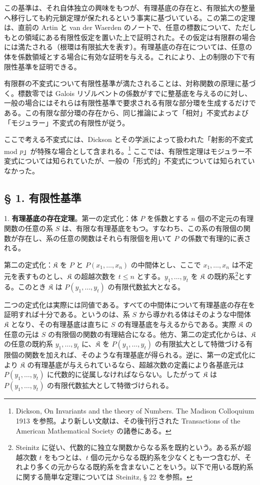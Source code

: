 \documentclass[11pt]{article}
\begin{document}
この基準は、それ自体独立の興味をもつが、有理基底の存在と、有限拡大の整量へ移行しても約元鎖定理が保たれるという事実に基づいている。この第二の定理は、直前の Artin と van der Waerden のノートで、任意の標数について、ただしもとの領域にある有限性仮定を置いた上で証明された。その仮定は有限群の場合には満たされる（根環は有限拡大を表す）。有理基底の存在については、任意の体を係数領域とする場合に有効な証明を与える。これにより、上の制限の下で有限性基準を証明できる。

有限群の不変式について有限性基準が満たされることは、対称関数の原理に基づく。標数零では Galois リゾルベントの係数がすでに整基底を与えるのに対し、一般の場合にはそれらは有限性基準で要求される有限な部分環を生成するだけである。この有限な部分環の存在から、同じ推論によって「相対」不変式および「モジュラー」不変式の有限性が従う。

ここで考える不変式には、Dickson とその学派によって扱われた「射影的不変式 mod $p$」が特殊な場合として含まれる。\footnote{Dickson, On Invariants and the theory of Numbers. The Madison Colloquium 1913 を参照。より新しい文献は、その後刊行された Transactions of the American Mathematical Society の諸巻にある。} ここでは、有限性定理はモジュラー不変式については知られていたが、一般の「形式的」不変式については知られていなかった。

\subsection*{§ 1. 有限性基準}

1. \textbf{有理基底の存在定理}。第一の定式化：体 $P$ を係数とする $n$ 個の不定元の有理関数の任意の系 $S$ は、有限な有理基底をもつ。すなわち、この系の有限個の関数が存在し、系の任意の関数はそれら有限個を用いて $P$ の係数で有理的に表される。

第二の定式化：$\mathfrak K$ を $P$ と $P(x_1,\ldots,x_n)$ の中間体とし、ここで $x_1,\ldots,x_n$ は不定元を表すものとし、$\mathfrak K$ の超越次数を $t\leq n$ とする。$y_1,\ldots,y_t$ を $\mathfrak K$ の既約系\footnote{Steinitz に従い、代数的に独立な関数からなる系を既約という。ある系が超越次数 $t$ をもつとは、$t$ 個の元からなる既約系を少なくとも一つ含むが、それより多くの元からなる既約系を含まないことをいう。以下で用いる既約系に関する簡単な定理については Steinitz, § 22 を参照。}とする。このとき $\mathfrak K$ は $P(y_1,\ldots,y_t)$ の有限代数拡大となる。

二つの定式化は実際には同値である。すべての中間体について有理基底の存在を証明すれば十分である。というのは、系 $S$ から導かれる体はそのような中間体 $\mathfrak K$ となり、その有理基底は直ちに $S$ の有理基底を与えるからである。実際 $\mathfrak K$ の任意の元は $S$ の有限個の関数の有理結合になる。他方、第二の定式化からは、$\mathfrak K$ の任意の既約系 $y_1,\ldots,y_t$ に、$\mathfrak K$ を $P(y_1,\ldots,y_t)$ の有限拡大として特徴づける有限個の関数を加えれば、そのような有理基底が得られる。逆に、第一の定式化により $\mathfrak K$ の有理基底が与えられているなら、超越次数の定義により各基底元は $P(y_1,\ldots,y_t)$ に代数的に従属しなければならない。したがって $\mathfrak K$ は $P(y_1,\ldots,y_t)$ の有限代数拡大として特徴づけられる。
\end{document}
